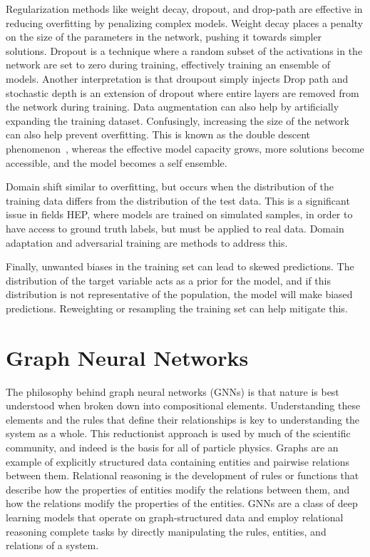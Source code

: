Regularization methods like weight decay, dropout, and drop-path are effective in reducing overfitting by penalizing complex models.
Weight decay places a penalty on the size of the parameters in the network, pushing it towards simpler solutions.
Dropout is a technique where a random subset of the activations in the network are set to zero during training, effectively training an ensemble of models.
Another interpretation is that droupout simply injects
Drop path and stochastic depth is an extension of dropout where entire layers are removed from the network during training.
Data augmentation can also help by artificially expanding the training dataset.
Confusingly, increasing the size of the network can also help prevent overfitting.
This is known as the double descent phenomenon~\cite{UnderstandingDoubleDescent}, whereas the effective model capacity grows, more solutions become accessible, and the model becomes a self ensemble.

Domain shift similar to overfitting, but occurs when the distribution of the training data differs from the distribution of the test data.
This is a significant issue in fields HEP, where models are trained on simulated samples, in order to have access to ground truth labels, but must be applied to real data.
Domain adaptation and adversarial training are methods to address this.

Finally, unwanted biases in the training set can lead to skewed predictions.
The distribution of the target variable acts as a prior for the model, and if this distribution is not representative of the population, the model will make biased predictions.
Reweighting or resampling the training set can help mitigate this.


\chapter{Graph Neural Networks}


The philosophy behind graph neural networks (GNNs) is that nature is best understood when broken down into compositional elements.
Understanding these elements and the rules that define their relationships is key to understanding the system as a whole.
This reductionist approach is used by much of the scientific community, and indeed is the basis for all of particle physics.
Graphs are an example of explicitly structured data containing entities and pairwise relations between them.
Relational reasoning is the development of rules or functions that describe how the properties of entities modify the relations between them, and how the relations modify the properties of the entities.
GNNs are a class of deep learning models that operate on graph-structured data and employ relational reasoning complete tasks by directly manipulating the rules, entities, and relations of a system.

